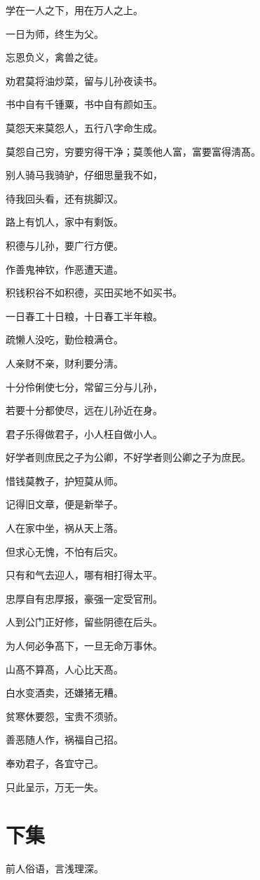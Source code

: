 \documentclass[12pt,oneside]{book}
\begin{document}
学在一人之下，用在万人之上。

一日为师，终生为父。

忘恩负义，禽兽之徒。

劝君莫将油炒菜，留与儿孙夜读书。

书中自有千锺粟，书中自有颜如玉。

莫怨天来莫怨人，五行八字命生成。

莫怨自己穷，穷要穷得干净；莫羡他人富，富要富得淸髙。

别人骑马我骑驴，仔细思量我不如，

待我回头看，还有挑脚汉。

路上有饥人，家中有剩饭。

积德与儿孙，要广行方便。

作善鬼神钦，作恶遭天遣。

积钱积谷不如积德，买田买地不如买书。

一日春工十日粮，十日春工半年粮。

疏懒人没吃，勤俭粮满仓。

人亲财不亲，财利要分淸。

十分伶俐使七分，常留三分与儿孙，

若要十分都使尽，远在儿孙近在身。

君子乐得做君子，小人枉自做小人。

好学者则庶民之子为公卿，不好学者则公卿之子为庶民。

惜钱莫教子，护短莫从师。

记得旧文章，便是新举子。

人在家中坐，祸从天上落。

但求心无愧，不怕有后灾。

只有和气去迎人，哪有相打得太平。

忠厚自有忠厚报，豪强一定受官刑。

人到公门正好修，留些阴德在后头。

为人何必争髙下，一旦无命万事休。

山髙不算髙，人心比天髙。

白水变酒卖，还嫌猪无糟。

贫寒休要怨，宝贵不须骄。

善恶随人作，祸福自己招。

奉劝君子，各宜守己。

只此呈示，万无一失。

\section{下集}
前人俗语，言浅理深。
\end{document}

